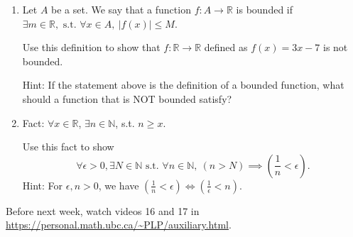\documentclass[12pt]{article}
\newcommand{\st}{\text{ s.t. }}
\begin{document}
\begin{enumerate}
\item Let $A$ be a set. We say that a function $f: A\to \mathbb R$ is bounded if $\exists m\in\mathbb R, \st \forall x\in A,\  |f(x)|\leq M$.

Use this definition to show that $f:\mathbb R\to \mathbb R$ defined as $f(x)=3x-7$ is not bounded.

Hint: If the statement above is the definition of a bounded function, what should a function that is NOT bounded satisfy?

\item Fact: $\forall x\in\mathbb R$, $\exists n\in\mathbb N$, s.t. $n\geq x$.

Use this fact to show
\[\forall \epsilon>0, \exists N\in\mathbb N \st \forall n\in\mathbb N,\ (n > N) \implies \left(\dfrac{1}{n}<\epsilon \right).\] 
Hint: For $\epsilon, n>0$, we have $(\frac 1n<\epsilon) \iff (\frac{1}{\epsilon}<n)$.

\end{enumerate}

Before next week, watch videos 16 and 17 in \url{https://personal.math.ubc.ca/~PLP/auxiliary.html}.
\end{document}
